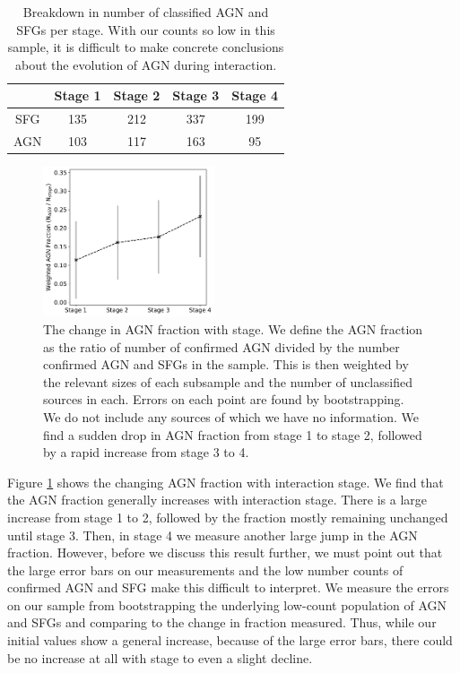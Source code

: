 \begin{table}
    \centering
    \begin{tabular}{|c|c|c|c|c|}
         & Stage 1 & Stage 2 & Stage 3 & Stage 4 \\
         \hline
        SFG & 135 & 212 & 337 & 199 \\
        AGN & 103 & 117 & 163 & 95
    \end{tabular}
    \caption{Breakdown in number of classified AGN and SFGs per stage. With our counts so low in this sample, it is difficult to make concrete conclusions about the evolution of AGN during interaction.}
    \label{tab:agn-sfg-breakdown}
\end{table}

\begin{figure}
    \centering
    \includegraphics[width=0.45\textwidth]{Chapter3/figures/agn-frac-time.pdf}
    \caption{The change in AGN fraction with stage. We define the AGN fraction as the ratio of number of confirmed AGN divided by the number confirmed AGN and SFGs in the sample. This is then weighted by the relevant sizes of each subsample and the number of unclassified sources in each. Errors on each point are found by bootstrapping. We do not include any sources of which we have no information. We find a sudden drop in AGN fraction from stage 1 to stage 2, followed by a rapid increase from stage 3 to 4.}
    \label{fig:agn-frac-time}
\end{figure}

Figure \ref{fig:agn-frac-time} shows the changing AGN fraction with interaction stage. We find that the AGN fraction generally increases with interaction stage. There is a large increase from stage 1 to 2, followed by the fraction mostly remaining unchanged until stage 3. Then, in stage 4 we measure another large jump in the AGN fraction. However, before we discuss this result further, we must point out that the large error bars on our measurements and the low number counts of confirmed AGN and SFG make this difficult to interpret. We measure the errors on our sample from bootstrapping the underlying low-count population of AGN and SFGs and comparing to the change in fraction measured. Thus, while our initial values show a general increase, because of the large error bars, there could be no increase at all with stage to even a slight decline.

